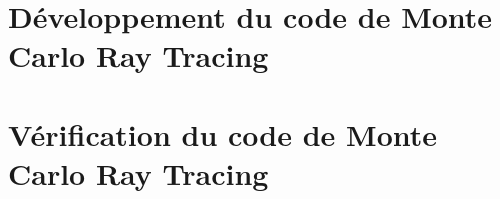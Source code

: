 \chapter{Développement du code de Monte Carlo Ray Tracing}
\label{part:c2}

 
 

\chapter{Vérification du code de Monte Carlo Ray Tracing}
\label{part:c2_bis}



%

%

%

%

